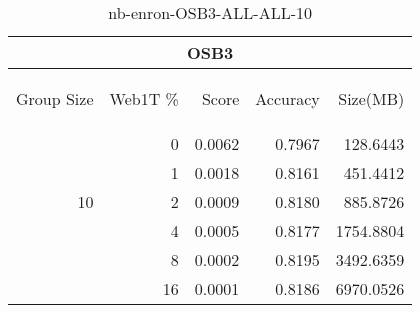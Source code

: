 \begin{center}
\begin{table}[htbp] 
 \begin{center}
\begin{tabular}{ | r | r | r | r | r |}
\hline
\multicolumn{5}{|c|}{OSB3}\\
\hline
\begin{sideways}Group Size\end{sideways} & \begin{sideways}Web1T \%\end{sideways} & \begin{sideways}Score\end{sideways} & \begin{sideways}Accuracy\end{sideways} & \begin{sideways}Size(MB)\end{sideways}\\
\hline
\multirow{5}{*}{10}
 & 0 & 0.0062 & 0.7967 & 128.6443\\ \cline{2-5}
 & 1 & 0.0018 & 0.8161 & 451.4412\\ \cline{2-5}
 & 2 & 0.0009 & 0.8180 & 885.8726\\ \cline{2-5}
 & 4 & 0.0005 & 0.8177 & 1754.8804\\ \cline{2-5}
 & 8 & 0.0002 & 0.8195 & 3492.6359\\ \cline{2-5}
 & 16 & 0.0001 & 0.8186 & 6970.0526\\ \cline{2-5}
\hline
\end{tabular}
\caption{nb-enron-OSB3-ALL-ALL-10}
\label{table:nb-enron-OSB3-ALL-ALL-10}
\end{center}
 \end{table}
\end{center}


